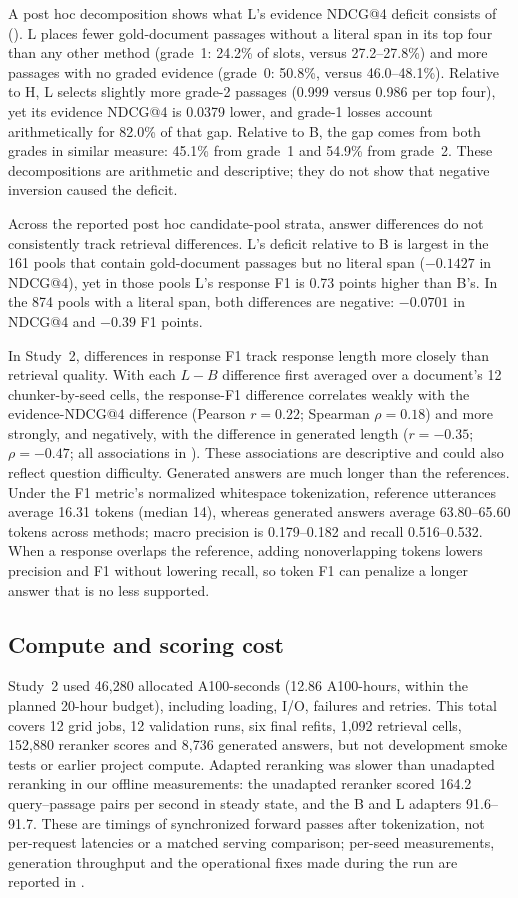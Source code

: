 A post hoc decomposition shows what L's evidence NDCG@4 deficit consists of (). L places fewer gold-document passages without a literal span in its top four than any other method (grade~1: 24.2\% of slots, versus 27.2--27.8\%) and more passages with no graded evidence (grade~0: 50.8\%, versus 46.0--48.1\%). Relative to H, L selects slightly more grade-2 passages (0.999 versus 0.986 per top four), yet its evidence NDCG@4 is 0.0379 lower, and grade-1 losses account arithmetically for 82.0\% of that gap. Relative to B, the gap comes from both grades in similar measure: 45.1\% from grade~1 and 54.9\% from grade~2. These decompositions are arithmetic and descriptive; they do not show that negative inversion caused the deficit.

Across the reported post hoc candidate-pool strata, answer differences do not consistently track retrieval differences. L's deficit relative to B is largest in the 161 pools that contain gold-document passages but no literal span ($-0.1427$ in NDCG@4), yet in those pools L's response F1 is 0.73 points higher than B's. In the 874 pools with a literal span, both differences are negative: $-0.0701$ in NDCG@4 and $-0.39$ F1 points.

In Study~2, differences in response F1 track response length more closely than retrieval quality. With each $L-B$ difference first averaged over a document's 12 chunker-by-seed cells, the response-F1 difference correlates weakly with the evidence-NDCG@4 difference (Pearson $r=0.22$; Spearman $\rho=0.18$) and more strongly, and negatively, with the difference in generated length ($r=-0.35$; $\rho=-0.47$; all associations in ). These associations are descriptive and could also reflect question difficulty. Generated answers are much longer than the references. Under the F1 metric's normalized whitespace tokenization, reference utterances average 16.31 tokens (median 14), whereas generated answers average 63.80--65.60 tokens across methods; macro precision is 0.179--0.182 and recall 0.516--0.532. When a response overlaps the reference, adding nonoverlapping tokens lowers precision and F1 without lowering recall, so token F1 can penalize a longer answer that is no less supported.

\subsection{Compute and scoring cost}
Study~2 used 46,280 allocated A100-seconds (12.86 A100-hours, within the planned 20-hour budget), including loading, I/O, failures and retries. This total covers 12 grid jobs, 12 validation runs, six final refits, 1,092 retrieval cells, 152,880 reranker scores and 8,736 generated answers, but not development smoke tests or earlier project compute. Adapted reranking was slower than unadapted reranking in our offline measurements: the unadapted reranker scored 164.2 query--passage pairs per second in steady state, and the B and L adapters 91.6--91.7. These are timings of synchronized forward passes after tokenization, not per-request latencies or a matched serving comparison; per-seed measurements, generation throughput and the operational fixes made during the run are reported in .

